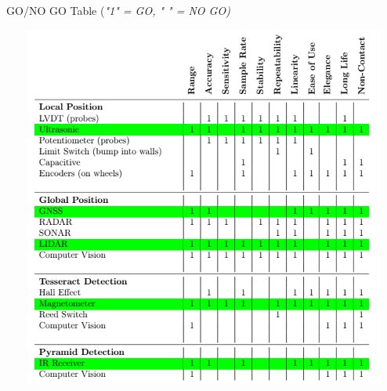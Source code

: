 \documentclass[12pt]{article}
\begin{document}
\vspace{0.00mm}
\begin{table}[htb!]
\begin{center}
\caption{GO/NO GO Table (\textit{"1" = GO, " " = NO GO)}}
\includegraphics[height =12cm, width = 15cm]{Figures/go_nogo}
\end{center}
\end{table}
\end{document}
